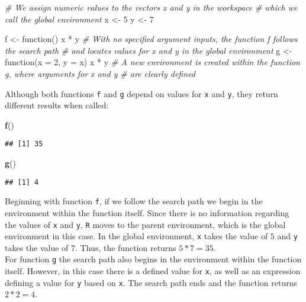 \documentclass[11,]{article}
\newenvironment{Shaded}{\begin{snugshade}}{\end{snugshade}}
\newcommand{\KeywordTok}[1]{\textcolor[rgb]{0.13,0.29,0.53}{\textbf{{#1}}}}
\newcommand{\DataTypeTok}[1]{\textcolor[rgb]{0.13,0.29,0.53}{{#1}}}
\newcommand{\DecValTok}[1]{\textcolor[rgb]{0.00,0.00,0.81}{{#1}}}
\newcommand{\StringTok}[1]{\textcolor[rgb]{0.31,0.60,0.02}{{#1}}}
\newcommand{\CommentTok}[1]{\textcolor[rgb]{0.56,0.35,0.01}{\textit{{#1}}}}
\newcommand{\NormalTok}[1]{{#1}}
\begin{document}
\begin{Shaded}
\begin{Highlighting}[]
\CommentTok{# We assign numeric values to the vectors x and y in the workspace }
\CommentTok{# which we call the global environment}
\NormalTok{x <-}\StringTok{ }\DecValTok{5}
\NormalTok{y <-}\StringTok{ }\DecValTok{7}

\NormalTok{f <-}\StringTok{ }\NormalTok{function() x *}\StringTok{ }\NormalTok{y}
  \CommentTok{# With no specified argument inputs, the function f follows the search path}
  \CommentTok{# and locates values for x and y in the global environment}
\NormalTok{g <-}\StringTok{ }\NormalTok{function(}\DataTypeTok{x =} \DecValTok{2}\NormalTok{, }\DataTypeTok{y =} \NormalTok{x) x *}\StringTok{ }\NormalTok{y}
  \CommentTok{# A new environment is created within the function g, where arguments for x and y}
  \CommentTok{# are clearly defined}
\end{Highlighting}
\end{Shaded}

Although both functions \texttt{f} and \texttt{g} depend on values for
\texttt{x} and \texttt{y}, they return different results when called:

\begin{Shaded}
\begin{Highlighting}[]
\KeywordTok{f}\NormalTok{()}
\end{Highlighting}
\end{Shaded}

\begin{verbatim}
## [1] 35
\end{verbatim}

\begin{Shaded}
\begin{Highlighting}[]
\KeywordTok{g}\NormalTok{()}
\end{Highlighting}
\end{Shaded}

\begin{verbatim}
## [1] 4
\end{verbatim}

Beginning with function \texttt{f}, if we follow the search path we
begin in the environment within the function itself. Since there is no
information regarding the values of \texttt{x} and \texttt{y},
\texttt{R} moves to the parent environment, which is the global
environment in this case. In the global environment, \texttt{x} takes
the value of \(5\) and \texttt{y} takes the value of \(7\). Thus, the
function returns \(5*7=35\).\\
For function \texttt{g} the search path also begins in the environment
within the function itself. However, in this case there is a defined
value for \texttt{x}, as well as an expression defining a value for
\texttt{y} based on \texttt{x}. The search path ends and the function
returns \(2*2=4\).
\end{document}
